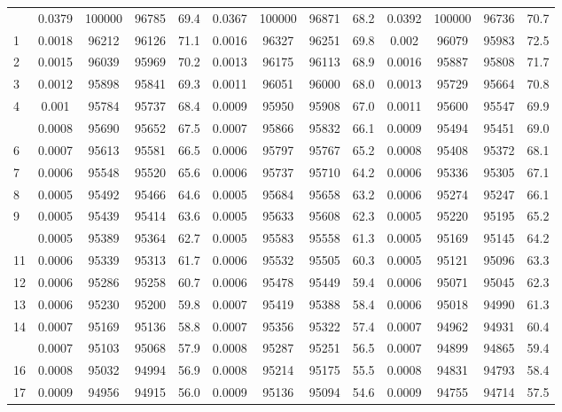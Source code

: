 \documentclass[
  14pt,
]{article}
\begin{document}
\begin{longtable}[t]{lcccccccccccc}
\endfoot
\bottomrule
\endlastfoot
0 & 0.0379 & 100000 & 96785 & 69.4 & 0.0367 & 100000 & 96871 & 68.2 & 0.0392 & 100000 & 96736 & 70.7\\
1 & 0.0018 & 96212 & 96126 & 71.1 & 0.0016 & 96327 & 96251 & 69.8 & 0.002 & 96079 & 95983 & 72.5\\
2 & 0.0015 & 96039 & 95969 & 70.2 & 0.0013 & 96175 & 96113 & 68.9 & 0.0016 & 95887 & 95808 & 71.7\\
3 & 0.0012 & 95898 & 95841 & 69.3 & 0.0011 & 96051 & 96000 & 68.0 & 0.0013 & 95729 & 95664 & 70.8\\
4 & 0.001 & 95784 & 95737 & 68.4 & 0.0009 & 95950 & 95908 & 67.0 & 0.0011 & 95600 & 95547 & 69.9\\
\addlinespace
5 & 0.0008 & 95690 & 95652 & 67.5 & 0.0007 & 95866 & 95832 & 66.1 & 0.0009 & 95494 & 95451 & 69.0\\
6 & 0.0007 & 95613 & 95581 & 66.5 & 0.0006 & 95797 & 95767 & 65.2 & 0.0008 & 95408 & 95372 & 68.1\\
7 & 0.0006 & 95548 & 95520 & 65.6 & 0.0006 & 95737 & 95710 & 64.2 & 0.0006 & 95336 & 95305 & 67.1\\
8 & 0.0005 & 95492 & 95466 & 64.6 & 0.0005 & 95684 & 95658 & 63.2 & 0.0006 & 95274 & 95247 & 66.1\\
9 & 0.0005 & 95439 & 95414 & 63.6 & 0.0005 & 95633 & 95608 & 62.3 & 0.0005 & 95220 & 95195 & 65.2\\
\addlinespace
10 & 0.0005 & 95389 & 95364 & 62.7 & 0.0005 & 95583 & 95558 & 61.3 & 0.0005 & 95169 & 95145 & 64.2\\
11 & 0.0006 & 95339 & 95313 & 61.7 & 0.0006 & 95532 & 95505 & 60.3 & 0.0005 & 95121 & 95096 & 63.3\\
12 & 0.0006 & 95286 & 95258 & 60.7 & 0.0006 & 95478 & 95449 & 59.4 & 0.0006 & 95071 & 95045 & 62.3\\
13 & 0.0006 & 95230 & 95200 & 59.8 & 0.0007 & 95419 & 95388 & 58.4 & 0.0006 & 95018 & 94990 & 61.3\\
14 & 0.0007 & 95169 & 95136 & 58.8 & 0.0007 & 95356 & 95322 & 57.4 & 0.0007 & 94962 & 94931 & 60.4\\
\addlinespace
15 & 0.0007 & 95103 & 95068 & 57.9 & 0.0008 & 95287 & 95251 & 56.5 & 0.0007 & 94899 & 94865 & 59.4\\
16 & 0.0008 & 95032 & 94994 & 56.9 & 0.0008 & 95214 & 95175 & 55.5 & 0.0008 & 94831 & 94793 & 58.4\\
17 & 0.0009 & 94956 & 94915 & 56.0 & 0.0009 & 95136 & 95094 & 54.6 & 0.0009 & 94755 & 94714 & 57.5\\

\end{longtable}
\end{document}
